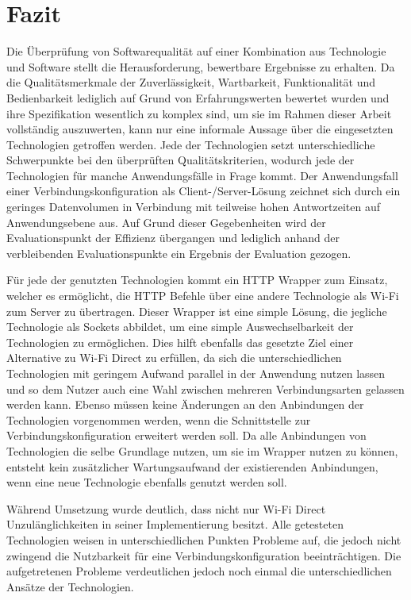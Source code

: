\section{Fazit}

Die Überprüfung von Softwarequalität auf einer Kombination aus Technologie und Software stellt die Herausforderung, bewertbare Ergebnisse zu erhalten. Da die Qualitätsmerkmale der Zuverlässigkeit, Wartbarkeit, Funktionalität und Bedienbarkeit lediglich auf Grund von Erfahrungswerten bewertet wurden und ihre Spezifikation wesentlich zu komplex sind, um sie im Rahmen dieser Arbeit vollständig auszuwerten, kann nur eine informale Aussage über die eingesetzten Technologien getroffen werden. Jede der Technologien setzt unterschiedliche Schwerpunkte bei den überprüften Qualitätskriterien, wodurch jede der Technologien für manche Anwendungsfälle in Frage kommt. Der Anwendungsfall einer Verbindungskonfiguration als Client-/Server-Lösung zeichnet sich durch ein geringes Datenvolumen in Verbindung mit teilweise hohen Antwortzeiten auf Anwendungsebene aus. Auf Grund dieser Gegebenheiten wird der Evaluationspunkt der Effizienz übergangen und lediglich anhand der verbleibenden Evaluationspunkte ein Ergebnis der Evaluation gezogen.

Für jede der genutzten Technologien kommt ein HTTP Wrapper zum Einsatz, welcher es ermöglicht, die HTTP Befehle über eine andere Technologie als Wi-Fi zum Server zu übertragen. Dieser Wrapper ist eine simple Lösung, die jegliche Technologie als Sockets abbildet, um eine simple Auswechselbarkeit der Technologien zu ermöglichen. Dies hilft ebenfalls das gesetzte Ziel einer Alternative zu Wi-Fi Direct zu erfüllen, da sich die unterschiedlichen Technologien mit geringem Aufwand parallel in der Anwendung nutzen lassen und so dem Nutzer auch eine Wahl zwischen mehreren Verbindungsarten gelassen werden kann. Ebenso müssen keine Änderungen an den Anbindungen der Technologien vorgenommen werden, wenn die Schnittstelle zur Verbindungskonfiguration erweitert werden soll. Da alle Anbindungen von Technologien die selbe Grundlage nutzen, um sie im Wrapper nutzen zu können, entsteht kein zusätzlicher Wartungsaufwand der existierenden Anbindungen, wenn eine neue Technologie ebenfalls genutzt werden soll.

Während Umsetzung wurde deutlich, dass nicht nur Wi-Fi Direct \linebreak Unzulänglichkeiten in seiner Implementierung besitzt. Alle getesteten Technologien weisen in unterschiedlichen Punkten Probleme auf, die jedoch nicht zwingend die Nutzbarkeit für eine Verbindungskonfiguration beeinträchtigen. Die aufgetretenen Probleme verdeutlichen jedoch noch einmal die unterschiedlichen Ansätze der Technologien.

